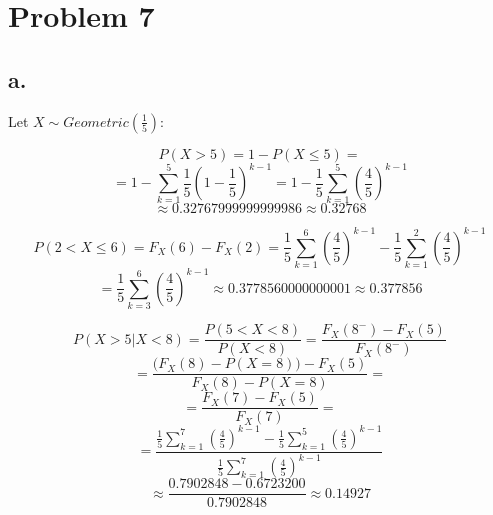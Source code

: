 \documentclass{article}
\begin{document}
\section*{Problem 7}

\subsection*{a.}


Let \(X \sim Geometric(\frac{1}{5})\):

\begin{equation*}
    P(X > 5) = 1 - P(X \leq 5) = 
\end{equation*}
\begin{equation*}
    = 1 - \sum_{k=1}^{5} \frac{1}{5}(1 - \frac{1}{5})^{k-1} = 1 - \frac{1}{5}\sum_{k=1}^{5}(\frac{4}{5})^{k-1}
\end{equation*}
\begin{equation*}
    \approx 0.32767999999999986 \approx 0.32768
\end{equation*}

\begin{equation*}
    P(2 < X \leq 6) = F_{X}(6) -  F_{X}(2) = \frac{1}{5}\sum_{k=1}^{6}(\frac{4}{5})^{k-1} - \frac{1}{5}\sum_{k=1}^{2}(\frac{4}{5})^{k-1}
\end{equation*}
\begin{equation*}
    = \frac{1}{5}\sum_{k=3}^{6}(\frac{4}{5})^{k-1} \approx 0.3778560000000001 \approx 0.377856
\end{equation*}

\begin{equation*}
    P(X>5|X<8) = \frac{P(5 < X < 8)}{P(X<8)} = \frac{F_{X}(8^{-}) - F_{X}(5)}{F_{X}(8^{-})}
\end{equation*}
\begin{equation*}
    = \frac{\Big(F_{X}(8) - P(X=8)\Big) - F_{X}(5)}{F_{X}(8) - P(X=8)} = 
\end{equation*}
\begin{equation*}
    = \frac{F_{X}(7) - F_{X}(5)}{F_{X}(7)} = 
\end{equation*}
\begin{equation*}
   = \frac{\frac{1}{5}\sum_{k=1}^{7}(\frac{4}{5})^{k-1} - \frac{1}{5}\sum_{k=1}^{5}(\frac{4}{5})^{k-1}}{\frac{1}{5}\sum_{k=1}^{7}(\frac{4}{5})^{k-1}}
\end{equation*}
\begin{equation*}
    \approx \frac{0.7902848 - 0.6723200}{0.7902848} \approx 0.14927
\end{equation*}
\end{document}
